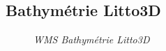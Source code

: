 \subsection{Bathymétrie Litto3D}
\begin{center}
\begin{figure}[ht]
\caption{\label{bathyLitto3D}\textit{WMS Bathymétrie Litto3D}}
\end{figure}
\end{center}
